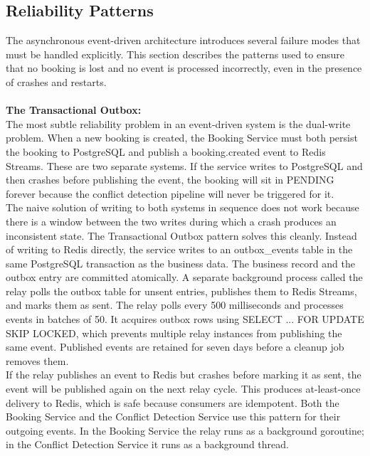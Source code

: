 \documentclass{article}
\begin{document}
\subsection{Reliability Patterns}
The asynchronous event-driven architecture introduces several failure modes that must be handled explicitly. This section describes the patterns used to ensure that no booking is lost and no event is processed incorrectly, even in the presence of crashes and restarts.\\\\
\textbf{The Transactional Outbox:}\\
The most subtle reliability problem in an event-driven system is the dual-write problem. When a new booking is created, the Booking Service must both persist the booking to PostgreSQL and publish a booking.created event to Redis Streams. These are two separate systems. If the service writes to PostgreSQL and then crashes before publishing the event, the booking will sit in PENDING forever because the conflict detection pipeline will never be triggered for it.\\
The naive solution of writing to both systems in sequence does not work because there is a window between the two writes during which a crash produces an inconsistent state. The Transactional Outbox pattern solves this cleanly. Instead of writing to Redis directly, the service writes to an outbox_events table in the same PostgreSQL transaction as the business data. The business record and the outbox entry are committed atomically. A separate background process called the relay polls the outbox table for unsent entries, publishes them to Redis Streams, and marks them as sent. The relay polls every 500 milliseconds and processes events in batches of 50. It acquires outbox rows using SELECT ... FOR UPDATE SKIP LOCKED, which prevents multiple relay instances from publishing the same event. Published events are retained for seven days before a cleanup job removes them.\\
If the relay publishes an event to Redis but crashes before marking it as sent, the event will be published again on the next relay cycle. This produces at-least-once delivery to Redis, which is safe because consumers are idempotent. Both the Booking Service and the Conflict Detection Service use this pattern for their outgoing events. In the Booking Service the relay runs as a background goroutine; in the Conflict Detection Service it runs as a background thread.\\\\
\end{document}
